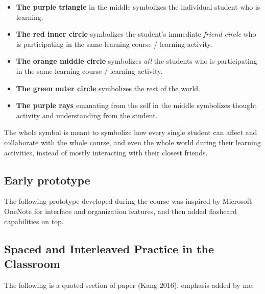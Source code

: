 \begin{itemize}
\tightlist
\item
  \textbf{The purple triangle} in the middle symbolizes the individual
  student who is learning.
\item
  \textbf{The red inner circle} symbolizes the student's immediate
  \emph{friend circle} who is participating in the same learning course
  / learning activity.
\item
  \textbf{The orange middle circle} symbolizes \emph{all} the students
  who is participating in the same learning course / learning activity.
\item
  \textbf{The green outer circle} symbolizes the rest of the world.
\item
  \textbf{The purple rays} emanating from the self in the middle
  symbolizes thought activity and understanding from the student.
\end{itemize}

The whole symbol is meant to symbolize how every single student can
affect and collaborate with the whole course, and even the whole world
during their learning activities, instead of mostly interacting with
their closest friends.

\newpage

\subsection{Early prototype}\label{sec:prototype}

The following prototype developed during the course was inspired by
Microsoft OneNote for interface and organization features, and then
added flashcard capabilities on top.



\newpage

\subsection{Spaced and Interleaved Practice in the
Classroom}\label{sec:classroom}

The following is a quoted section of paper (Kang 2016), emphasis added
by me:

